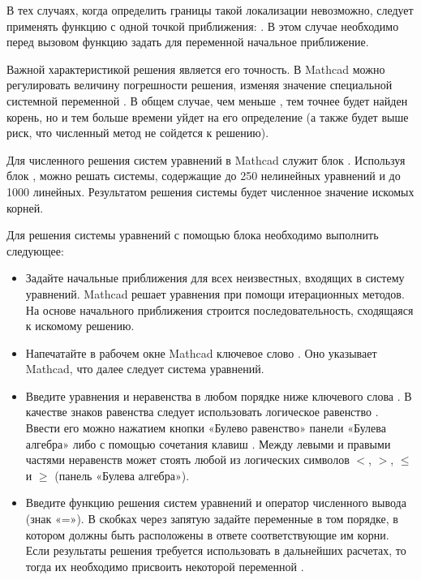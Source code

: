 В тех случаях, когда определить границы такой локализации невозможно, следует применять функцию  с одной точкой приближения: . В этом случае необходимо перед вызовом функцию  задать для переменной  начальное приближение.

Важной характеристикой решения является его точность. В Mathcad можно регулировать величину погрешности решения, изменяя значение специальной системной переменной . В общем случае, чем меньше , тем точнее будет найден корень, но и тем больше времени уйдет на его определение (а также будет выше риск, что численный метод не сойдется к решению).


Для численного решения систем уравнений в Mathcad служит блок . Используя блок , можно решать системы, содержащие до 250 нелинейных уравнений и до 1000 линейных. Результатом решения системы будет численное значение искомых корней.


Для решения системы уравнений с помощью блока  необходимо выполнить следующее:
\begin{itemize}
	\item Задайте начальные приближения для всех неизвестных, входящих в систему уравнений. Mathcad решает уравнения при помощи итерационных методов. На основе начального приближения строится последовательность, сходящаяся к искомому решению. 
	\item Напечатайте в рабочем окне Mathcad ключевое слово . Оно указывает Mathcad, что далее следует система уравнений.
	\item Введите уравнения и неравенства в любом порядке ниже ключевого слова . В качестве знаков равенства следует использовать логическое равенство . Ввести его можно нажатием кнопки «Булево равенство» панели «Булева алгебра» либо с помощью сочетания клавиш \keys{\ctrl+ =}. Между левыми и правыми частями неравенств может стоять любой из логических символов $<$, $>$, $\leqslant$ и $\geqslant$ (панель «Булева алгебра»).
	\item Введите функцию решения систем уравнений  и оператор численного вывода (знак «=»). В скобках через запятую задайте переменные в том порядке, в котором должны быть расположены в ответе соответствующие им корни. Если результаты решения требуется использовать в дальнейших расчетах, то тогда их необходимо присвоить некоторой переменной .
\end{itemize}

